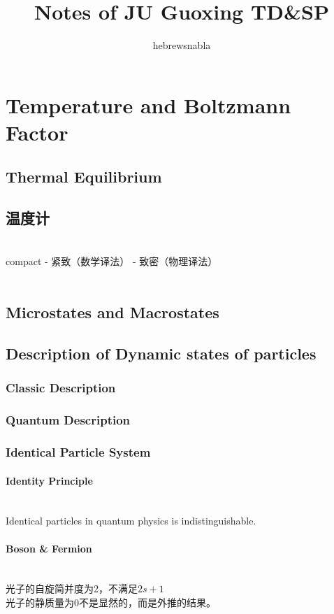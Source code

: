 \documentclass[UTF8]{ctexart} %
\title{Notes of JU Guoxing TD\&SP}
\author{hebrewsnabla}
\numberwithin{equation}{subsection}
\begin{document}
\maketitle
\setcounter{section}{3}
\section{Temperature and Boltzmann Factor}
\subsection{Thermal Equilibrium}
\subsection{温度计}



~\\
compact - 紧致（数学译法） - 致密（物理译法）\\

~\\

\subsection{Microstates and Macrostates}
\subsection{Description of Dynamic states of particles}
\subsubsection{Classic Description}
\subsubsection{Quantum Description}
\subsubsection{Identical Particle System}
\paragraph{Identity Principle}~\\
Identical particles in quantum physics is indistinguishable.
\paragraph{Boson \& Fermion}~\\
光子的自旋简并度为2，不满足$2s+1$\\
光子的静质量为0不是显然的，而是外推的结果。\\
\end{document}
